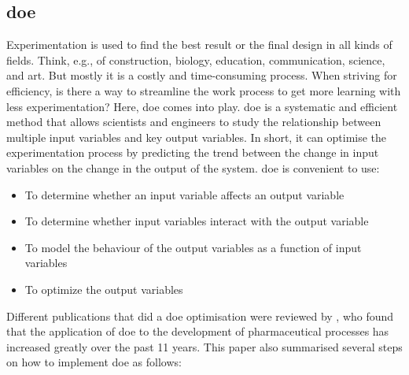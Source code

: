 \subsection{\acrfull{doe}}
\label{sec: DoE}
Experimentation is used to find the best result or the final design in all kinds of fields. Think, e.g., of construction, biology, education, communication, science, and art. But mostly it is a costly and time-consuming process. When striving for efficiency, is there a way to streamline the work process to get more learning with less experimentation? Here, \acrfull{doe} comes into play. \acrshort{doe} is a systematic and efficient method that allows scientists and engineers to study the relationship between multiple input variables and key output variables. In short, it can optimise the experimentation process by predicting the trend between the change in input variables on the change in the output of the system. \acrshort{doe} is convenient to use:
\begin{itemize}
    \item To determine whether an input variable affects an output variable
    \item To determine whether input variables interact with the output variable
    \item To model the behaviour of the output variables as a function of input variables
    \item To optimize the output variables
\end{itemize}


Different publications that did a \acrshort{doe} optimisation were reviewed by \citet{Weissman2015}, who found that the application of \acrshort{doe} to the development of pharmaceutical processes has increased greatly over the past 11 years. This paper also summarised several steps on how to implement \acrshort{doe} as follows:

